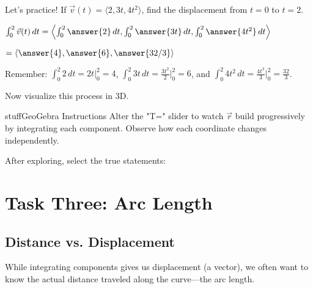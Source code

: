 \documentclass{ximera}
\begin{document}
\begin{problem}
Let's practice! If $\vec{v}(t) = \langle 2, 3t, 4t^2 \rangle$, find the displacement from $t=0$ to $t=2$.

$\int_0^2 \vec{v}(t) \, dt = \left\langle \int_0^2 \answer{2} \, dt, \int_0^2 \answer{3t} \, dt, \int_0^2 \answer{4t^2} \, dt \right\rangle$

$= \langle \answer{4}, \answer{6}, \answer{32/3} \rangle$

\begin{feedback}
Remember: $\int_0^2 2 \, dt = 2t \big|_0^2 = 4$, $\int_0^2 3t \, dt = \frac{3t^2}{2} \big|_0^2 = 6$, and $\int_0^2 4t^2 \, dt = \frac{4t^3}{3} \big|_0^2 = \frac{32}{3}$.
\end{feedback}
\end{problem}

\begin{problem}
Now visualize this process in 3D.

\begin{expandable}{stuff}{GeoGebra Instructions}
    Alter the "T=" slider to watch $\vec{r}$ build progressively by integrating each component. Observe how each coordinate changes independently.
\end{expandable}

\begin{center}
\end{center}

After exploring, select the true statements:
\begin{selectAll}
\end{selectAll}
\end{problem}

\section*{Task Three: Arc Length}

\subsection*{Distance vs. Displacement}

While integrating components gives us displacement (a vector), we often want to know the actual distance traveled along the curve—the arc length.
\end{document}
